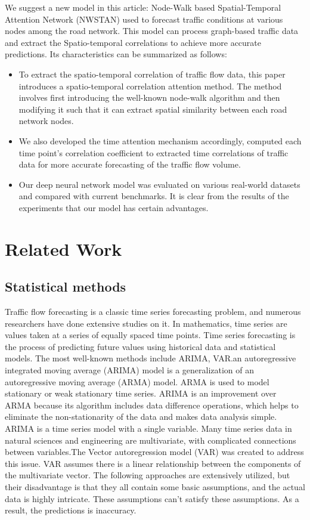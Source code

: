 \documentclass[conference]{IEEEtran}
\begin{document}
\par
We suggest a new model in this article: Node-Walk based Spatial-Temporal Attention Network (NWSTAN) used to forecast traffic conditions at various nodes among the road network. This model can process graph-based traffic data and extract the Spatio-temporal correlations to achieve more accurate predictions. Its characteristics can be summarized as follows:
\par
\begin{itemize}
    \item To extract the spatio-temporal correlation of traffic flow data, this paper introduces a spatio-temporal correlation attention method. The method involves first introducing the well-known node-walk algorithm and then modifying it such that it can extract spatial similarity between each road network nodes. 
    \item We also developed the time attention mechanism accordingly, computed each time point's correlation coefficient to extracted time correlations of traffic data for more accurate forecasting of the traffic flow volume.
    \item Our deep neural network model was evaluated on various real-world datasets and compared with current benchmarks. It is clear from the results of the experiments that our model has certain advantages.
\end{itemize}

\section{Related Work}

\subsection{Statistical methods}
Traffic flow forecasting is a classic time series forecasting problem, and numerous researchers have done extensive studies on it. In mathematics, time series are values taken at a series of equally spaced time points. Time series forecasting is the process of predicting future values using historical data and statistical models. The most well-known methods include ARIMA, VAR.an autoregressive integrated moving average (ARIMA) model is a generalization of an autoregressive moving average (ARMA) model. ARMA is used to model stationary or weak stationary time series. ARIMA is an improvement over ARMA because its algorithm includes data difference operations, which helps to eliminate the non-stationarity of the data and makes data analysis simple. ARIMA is a time series model with a single variable. Many time series data in natural sciences and engineering are multivariate, with complicated connections between variables.The Vector autoregression model (VAR) was created to address this issue. VAR assumes there is a linear relationship between the components of the multivariate vector. The following approaches are extensively utilized, but their disadvantage is that they all contain some basic assumptions, and the actual data is highly intricate. These assumptions can't satisfy these assumptions. As a result, the predictions is inaccuracy.
\end{document}
